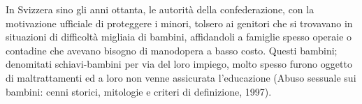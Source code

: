 In Svizzera sino gli anni ottanta, le autorità della confederazione, con la motivazione ufficiale di proteggere i minori, tolsero ai genitori che si trovavano in situazioni di difficoltà migliaia di bambini, affidandoli a famiglie spesso operaie o contadine che avevano bisogno di manodopera a basso costo. Questi bambini; denomitati schiavi-bambini per via del loro impiego, molto spesso furono oggetto di maltrattamenti ed a loro non venne assicurata l’educazione (Abuso sessuale sui bambini: cenni storici, mitologie e criteri di definizione, 1997).
